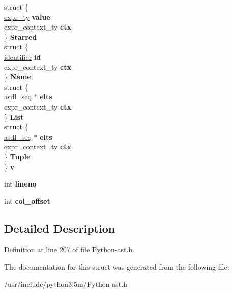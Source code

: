 \begin{DoxyCompactItemize}
\begin{tabbing}
\>struct \{\\
\>\>\hyperlink{struct__expr}{expr\_ty} {\bfseries value}\\
\>\>expr\_context\_ty {\bfseries ctx}\\
\>\} {\bfseries Starred}\\
\>struct \{\\
\>\>\hyperlink{struct__object}{identifier} {\bfseries id}\\
\>\>expr\_context\_ty {\bfseries ctx}\\
\>\} {\bfseries Name}\\
\>struct \{\\
\>\>\hyperlink{structasdl__seq}{asdl\_seq} $\ast$ {\bfseries elts}\\
\>\>expr\_context\_ty {\bfseries ctx}\\
\>\} {\bfseries List}\\
\>struct \{\\
\>\>\hyperlink{structasdl__seq}{asdl\_seq} $\ast$ {\bfseries elts}\\
\>\>expr\_context\_ty {\bfseries ctx}\\
\>\} {\bfseries Tuple}\\
\} {\bfseries v}\hypertarget{struct__expr_af987b625ff4f671902af36f2e594427c}{}\label{struct__expr_af987b625ff4f671902af36f2e594427c}
\\

\end{tabbing}\item 
int {\bfseries lineno}\hypertarget{struct__expr_a998fb97c3e3b6e418e07ba5a0e9673eb}{}\label{struct__expr_a998fb97c3e3b6e418e07ba5a0e9673eb}

\item 
int {\bfseries col\+\_\+offset}\hypertarget{struct__expr_a9e8fb71f839ec6124be14f3aeec7d721}{}\label{struct__expr_a9e8fb71f839ec6124be14f3aeec7d721}

\end{DoxyCompactItemize}


\subsection{Detailed Description}


Definition at line 207 of file Python-\/ast.\+h.



The documentation for this struct was generated from the following file\+:\begin{DoxyCompactItemize}
\item 
/usr/include/python3.\+5m/Python-\/ast.\+h\end{DoxyCompactItemize}
